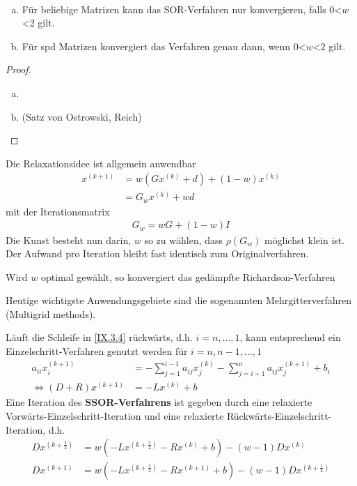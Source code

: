 \begin{Satze}~
  \begin{enumerate}[a)]
  \item Für beliebige Matrizen kann das SOR-Verfahren nur
    konvergieren, falls 0<$w$<2 gilt.
  \item Für spd Matrizen konvergiert das Verfahren genau dann, wenn
    0<$w$<2 gilt.
  \end{enumerate}
  \begin{proof}~
    \begin{enumerate}[a)]
    \item \cite{stoerbulirsch}
    \item (Satz von Ostrowski, Reich)
    \end{enumerate}
  \end{proof}
\end{Satze}

Die Relaxationsidee ist allgemein anwendbar
\begin{align}\nonumber
  x^{(k+1)}&= w(Gx^{(k)}+d)+(1-w)x^{(k)}\\
           &=G_wx^{(k)}+wd
             \label{IX.4.4}
\end{align}
mit der Iterationsmatrix
\begin{gather}
  G_w = wG+(1-w)I
  \label{IX.4.5}
\end{gather}
Die Kunst besteht nun darin, $w$ so zu wählen,
dass $\rho(G_w)$ möglichst klein ist.
Der Aufwand pro Iteration bleibt fast identisch
zum Originalverfahren.

Wird $w$ optimal gewählt, so konvergiert das gedämpfte
Richardson-Verfahren

Heutige wichtigste Anwendungsgebiete sind die sogenannten
Mehrgitterverfahren (Multigrid methods).

Läuft die Schleife in \eqref{IX.3.4} rückwärts,
d.h. $i=n,\dotsc,1$, kann entsprechend ein Einzelschritt-Verfahren
genutzt werden für $i=n,n-1,\dotsc,1$
\begin{align*}
  a_{ii}x_i^{(k+1)} &= -\sum_{j=1}^{i-1}a_{ij}x_j^{(k)}
                      -\sum_{j=i+1}^{n}a_{ij}x_j^{(k+1)}
                      +b_i \\
  \Leftrightarrow (D+R)x^{(k+1)} &= -Lx^{(k)}+b
\end{align*}
Eine Iteration des \textbf{SSOR-Verfahrens} ist gegeben durch
eine relaxierte Vorwärts-Einzelschritt-Iteration und eine
relaxierte Rückwärts-Einzelschritt-Iteration, d.h.
\begin{align}
  Dx^{(k+\frac{1}{2})} &= w(-Lx^{(k+\frac{1}{2})}-Rx^{(k)}+b)
                         -(w-1)Dx^{(k)}\\\nonumber
  Dx^{(k+1)}&=w(-Lx^{(k+\frac{1}{2})}-Rx^{(k+1)}+b)
              -(w-1)Dx^{(k+\frac{1}{2})}
\end{align}



